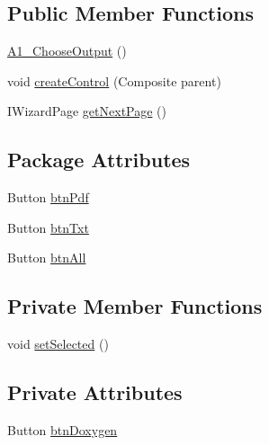\subsection*{Public Member Functions}
\begin{DoxyCompactItemize}
\item 
\hyperlink{classit_1_1isislab_1_1masonassisteddocumentation_1_1mason_1_1wizards_1_1_a1___choose_output_aba04d6e4cd59c54217ea65e4fb06122e}{A1\-\_\-\-Choose\-Output} ()
\item 
void \hyperlink{classit_1_1isislab_1_1masonassisteddocumentation_1_1mason_1_1wizards_1_1_a1___choose_output_a9f06e01c71cae4b98c300170ab2515a5}{create\-Control} (Composite parent)
\item 
I\-Wizard\-Page \hyperlink{classit_1_1isislab_1_1masonassisteddocumentation_1_1mason_1_1wizards_1_1_a1___choose_output_aec3a9e606237eb3fc60b7936749fc91e}{get\-Next\-Page} ()
\end{DoxyCompactItemize}
\subsection*{Package Attributes}
\begin{DoxyCompactItemize}
\item 
Button \hyperlink{classit_1_1isislab_1_1masonassisteddocumentation_1_1mason_1_1wizards_1_1_a1___choose_output_a9b810d24e36dd0e722f76a0f0a9b064b}{btn\-Pdf}
\item 
Button \hyperlink{classit_1_1isislab_1_1masonassisteddocumentation_1_1mason_1_1wizards_1_1_a1___choose_output_a7a3e59d93bfba5d422c70ffdaf34f8ae}{btn\-Txt}
\item 
Button \hyperlink{classit_1_1isislab_1_1masonassisteddocumentation_1_1mason_1_1wizards_1_1_a1___choose_output_aebfe811a15807a6648df6d7cb9ce1196}{btn\-All}
\end{DoxyCompactItemize}
\subsection*{Private Member Functions}
\begin{DoxyCompactItemize}
\item 
void \hyperlink{classit_1_1isislab_1_1masonassisteddocumentation_1_1mason_1_1wizards_1_1_a1___choose_output_a4602f301eef9ed9fbb73ef78b00ae401}{set\-Selected} ()
\end{DoxyCompactItemize}
\subsection*{Private Attributes}
\begin{DoxyCompactItemize}
\item 
Button \hyperlink{classit_1_1isislab_1_1masonassisteddocumentation_1_1mason_1_1wizards_1_1_a1___choose_output_a64285d7a7afd8d13b8da8dfc76d8c524}{btn\-Doxygen}
\end{DoxyCompactItemize}


